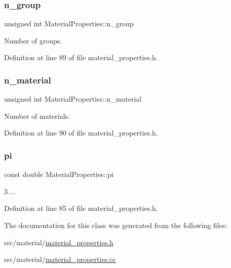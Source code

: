 \subsubsection{\texorpdfstring{n\+\_\+group}{n\_group}}
{\footnotesize\ttfamily unsigned int Material\+Properties\+::n\+\_\+group\hspace{0.3cm}{\ttfamily [private]}}



Number of groups. 



Definition at line 89 of file material\+\_\+properties.\+h.

\mbox{\label{class_material_properties_a3bc9713ea94f32fb93d60f2a726e4f2d}} 
\subsubsection{\texorpdfstring{n\+\_\+material}{n\_material}}
{\footnotesize\ttfamily unsigned int Material\+Properties\+::n\+\_\+material\hspace{0.3cm}{\ttfamily [private]}}



Number of materials. 



Definition at line 90 of file material\+\_\+properties.\+h.

\mbox{\label{class_material_properties_a28173c461cf9a74c3b0ebe0f51c386d3}} 
\subsubsection{\texorpdfstring{pi}{pi}}
{\footnotesize\ttfamily const double Material\+Properties\+::pi\hspace{0.3cm}{\ttfamily [private]}}



3.... 



Definition at line 85 of file material\+\_\+properties.\+h.



The documentation for this class was generated from the following files\+:\begin{DoxyCompactItemize}
\item 
src/material/\hyperlink{material__properties_8h}{material\+\_\+properties.\+h}\item 
src/material/\hyperlink{material__properties_8cc}{material\+\_\+properties.\+cc}\end{DoxyCompactItemize}
